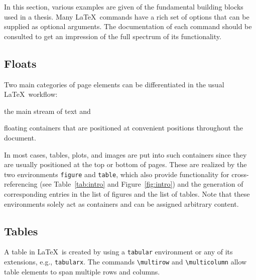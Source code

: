 In this section, various examples are given of the fundamental building blocks used in a thesis.
Many \LaTeX\ commands have a rich set of options that can be supplied as optional arguments.
The documentation of each command should be consulted to get an impression of the full spectrum of its functionality.

\subsection{Floats}

Two main categories of page elements can be differentiated in the usual \LaTeX\ workflow:
%
\begin{enumerate*}[label={\itshape(\roman*)}]
	\item the main stream of text and
	\item floating containers that are positioned at convenient positions throughout the document.
\end{enumerate*}
%
In most cases, tables, plots, and images are put into such containers since they are usually positioned at the top or bottom of pages.
These are realized by the two environments \verb|figure| and \verb|table|, which also provide functionality for cross-referencing (see Table~\ref{tab:intro} and Figure~\ref{fig:intro}) and the generation of corresponding entries in the list of figures and the list of tables.
Note that these environments solely act as containers and can be assigned arbitrary content.

\subsection{Tables}

A table in \LaTeX\ is created by using a \verb|tabular| environment or any of its extensions, e.g., \verb|tabularx|.
The commands \verb|\multirow| and \verb|\multicolumn| allow table elements to span multiple rows and columns.


